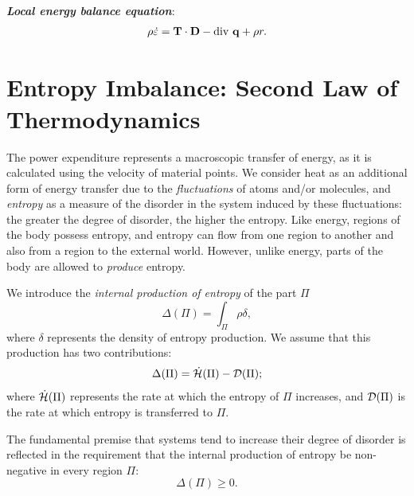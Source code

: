 \begin{definition}
	\textit{\textbf{Local energy balance equation}}:
	\begin{equation}\label{bilen}
	\rho	\dot{\varepsilon} =\mathbf{T} \cdot \mathbf{D} - \operatorname{div} \, \mathbf{q} + \rho r.
	\end{equation}
\end{definition}





\section{Entropy Imbalance: Second Law of Thermodynamics}

The power expenditure represents a macroscopic transfer of energy, as it is calculated using the velocity of material points. We consider heat as an additional form of energy transfer due to the \textit{fluctuations} of atoms and/or molecules, and \textit{entropy} as a measure of the disorder in the system induced by these fluctuations: the greater the degree of disorder, the higher the entropy. Like energy, regions of the body possess entropy, and entropy can flow from one region to another and also from a region to the external world. However, unlike energy, parts of the body are allowed to \textit{produce} entropy.

We introduce the \textit{internal production of entropy} of the part $\Pi$
\begin{equation}
	\Delta (\Pi)=\int_{\Pi}\rho\delta,
\end{equation}
where $\delta$ represents the density of entropy production. We assume that this production has two contributions:
\begin{equation}
	\Delta(\Pi)= \dot{\mathcal{H}}(\Pi)-\mathcal{D}(\Pi);
\end{equation}
where $\dot{\mathcal{H}}(\Pi)$ represents the rate at which the entropy of $\Pi$ increases, and $\mathcal{D}(\Pi)$ is the rate at which entropy is transferred to $\Pi$.

The fundamental premise that systems tend to increase their degree of disorder is reflected in the requirement that the internal production of entropy be non-negative in every region $\Pi$:
\begin{equation}
	\Delta(\Pi)\geq 0.
\end{equation}

